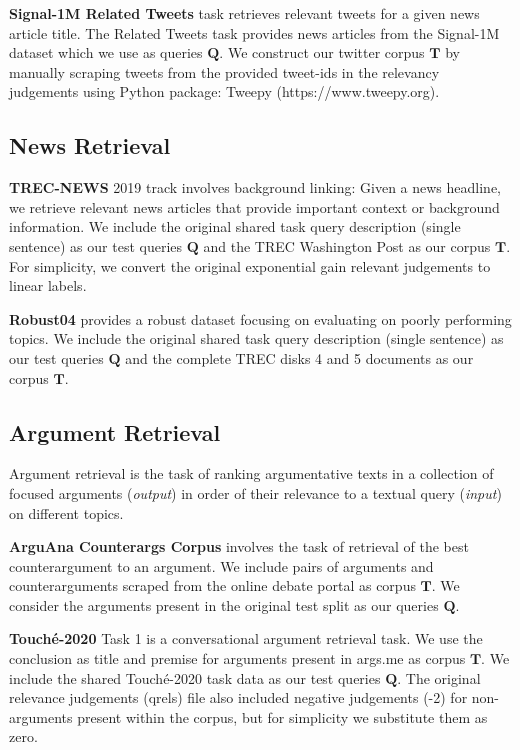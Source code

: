 \documentclass{article}
\begin{document}
\textbf{Signal-1M Related Tweets} \cite{Signal1MRelatedTweetsRetrieval2018} task retrieves relevant tweets for a given news article title. The Related Tweets task provides news articles from the Signal-1M dataset \cite{Signal1M2016} which we use as queries $\mathbf{Q}$. We construct our twitter corpus $\mathbf{T}$ by manually scraping tweets from the provided tweet-ids in the relevancy judgements using Python package: Tweepy (https://www.tweepy.org).

\vspace{-2mm}
\subsection{News Retrieval}
\vspace{-1mm}

\textbf{TREC-NEWS} \cite{soboroff2019trec} 2019 track involves background linking: Given a news headline, we retrieve relevant news articles that provide important context or background information. We include the original shared task query description (single sentence) as our test queries $\mathbf{Q}$ and the TREC Washington Post as our corpus $\mathbf{T}$. For simplicity, we convert the original exponential gain relevant judgements to linear labels. 

\textbf{Robust04} \cite{96071} provides a robust dataset focusing on evaluating on poorly performing topics. We include the original shared task query description (single sentence) as our test queries $\mathbf{Q}$ and the complete TREC disks 4 and 5 documents as our corpus $\mathbf{T}$.

\vspace{-2mm}
\subsection{Argument Retrieval}
\vspace{-1mm}
Argument retrieval is the task of ranking argumentative texts in a collection of focused arguments (\textit{output}) in order of their relevance to a textual query (\textit{input}) on different topics.

\textbf{ArguAna Counterargs Corpus} \cite{wachsmuth:2018a} involves the task of retrieval of the best counterargument to an argument. We include pairs of arguments and counterarguments scraped from the online debate portal as corpus $\mathbf{T}$. We consider the arguments present in the original test split as our queries $\mathbf{Q}$.

\textbf{Touch\'e-2020} \cite{stein:2020v} Task 1 is a conversational argument retrieval task. We use the conclusion as title and premise for arguments present in args.me \cite{stein:2017r} as corpus $\mathbf{T}$. We include the shared Touch\'e-2020 task data as our test queries $\mathbf{Q}$. The original relevance judgements (qrels) file also included negative judgements (-2) for non-arguments present within the corpus, but for simplicity we substitute them as zero.  
\end{document}
